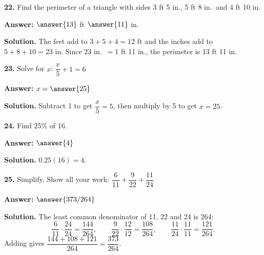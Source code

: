 \documentclass{ximera}
\begin{document}
\begin{problem}

\textbf{22.} Find the perimeter of a triangle with sides 3 ft 5 in., 5 ft 8 in.\ and
4 ft 10 in.

\textbf{Answer:} $\answer{13}$ ft $\answer{11}$ in.

\begin{hint}
\textbf{Solution.} The feet add to $3+5+4=12$ ft and the inches add to $5+8+10=23$ in.
Since $23$ in.\ $=1$ ft 11 in., the perimeter is $13$ ft 11 in.
\end{hint}
\end{problem}

\begin{problem}

\textbf{23.} Solve for $x$: $\dfrac{x}{5}+1=6$

\textbf{Answer:} $x=\answer{25}$

\begin{hint}
\textbf{Solution.} Subtract 1 to get $\dfrac{x}{5}=5$, then multiply by 5 to get $x=25$.
\end{hint}
\end{problem}

\begin{problem}

\textbf{24.} Find $25\%$ of 16.

\textbf{Answer:} $\answer{4}$

\begin{hint}
\textbf{Solution.} $0.25(16)=4$.
\end{hint}
\end{problem}

\begin{problem}

\textbf{25.} Simplify. Show all your work:
$\dfrac{6}{11}+\dfrac{9}{22}+\dfrac{11}{24}$

\textbf{Answer:} $\answer{373/264}$

\begin{hint}
\textbf{Solution.} The least common denominator of 11, 22 and 24 is 264:
\[
  \frac{6}{11}\cdot\frac{24}{24}=\frac{144}{264},\qquad
  \frac{9}{22}\cdot\frac{12}{12}=\frac{108}{264},\qquad
  \frac{11}{24}\cdot\frac{11}{11}=\frac{121}{264}.
\]
Adding gives $\dfrac{144+108+121}{264}=\dfrac{373}{264}$.
\end{hint}
\end{problem}
\end{document}
